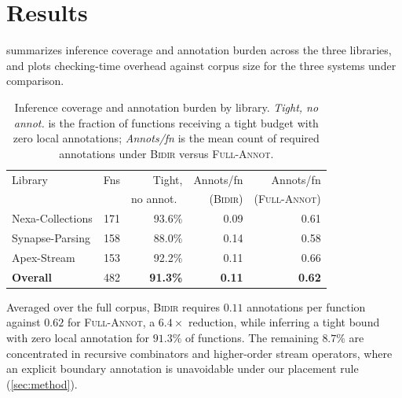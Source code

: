 \section{Results}
\label{sec:results}

 summarizes inference coverage and annotation burden
across the three libraries, and  plots checking-time
overhead against corpus size for the three systems under comparison.

\begin{table}[t]
  \centering
  \caption{Inference coverage and annotation burden by library.
    \emph{Tight, no annot.} is the fraction of functions receiving a
    tight budget with zero local annotations; \emph{Annots/fn} is the
    mean count of required annotations under \textsc{Bidir} versus
    \textsc{Full-Annot}.}
  \label{tab:results}
  \small
  \setlength{\tabcolsep}{4pt}
  \begin{tabular}{@{}lrrrr@{}}
    \toprule
    Library & Fns & Tight, & Annots/fn & Annots/fn \\
     & & no annot.\ & (\textsc{Bidir}) & (\textsc{Full-Annot}) \\
    \midrule
    Nexa-Collections   & 171 & 93.6\% & 0.09 & 0.61 \\
    Synapse-Parsing    & 158 & 88.0\% & 0.14 & 0.58 \\
    Apex-Stream        & 153 & 92.2\% & 0.11 & 0.66 \\
    \midrule
    \textbf{Overall}   & 482 & \textbf{91.3\%} & \textbf{0.11} & \textbf{0.62} \\
    \bottomrule
  \end{tabular}
\end{table}

Averaged over the full corpus, \textsc{Bidir} requires $0.11$
annotations per function against $0.62$ for \textsc{Full-Annot}, a
$6.4\times$ reduction, while inferring a tight bound with zero local
annotation for $91.3\%$ of functions. The remaining $8.7\%$ are
concentrated in recursive combinators and higher-order stream
operators, where an explicit boundary annotation is unavoidable under
our placement rule (\cref{sec:method}).

